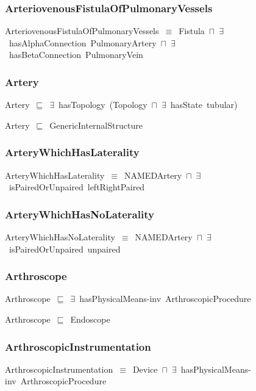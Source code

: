 \documentclass{article}
\begin{document}
\subsubsection*{ArteriovenousFistulaOfPulmonaryVessels}

ArteriovenousFistulaOfPulmonaryVessels~\ensuremath{\equiv}~Fistula~\ensuremath{\sqcap}~\ensuremath{\exists}~hasAlphaConnection~PulmonaryArtery~\ensuremath{\sqcap}~\ensuremath{\exists}~hasBetaConnection~PulmonaryVein

\subsubsection*{Artery}

Artery~\ensuremath{\sqsubseteq}~\ensuremath{\exists}~hasTopology~(Topology~\ensuremath{\sqcap}~\ensuremath{\exists}~hasState~tubular)~

Artery~\ensuremath{\sqsubseteq}~GenericInternalStructure~

\subsubsection*{ArteryWhichHasLaterality}

ArteryWhichHasLaterality~\ensuremath{\equiv}~NAMEDArtery~\ensuremath{\sqcap}~\ensuremath{\exists}~isPairedOrUnpaired~leftRightPaired

\subsubsection*{ArteryWhichHasNoLaterality}

ArteryWhichHasNoLaterality~\ensuremath{\equiv}~NAMEDArtery~\ensuremath{\sqcap}~\ensuremath{\exists}~isPairedOrUnpaired~unpaired

\subsubsection*{Arthroscope}

Arthroscope~\ensuremath{\sqsubseteq}~\ensuremath{\exists}~hasPhysicalMeans-inv~ArthroscopicProcedure~

Arthroscope~\ensuremath{\sqsubseteq}~Endoscope~

\subsubsection*{ArthroscopicInstrumentation}

ArthroscopicInstrumentation~\ensuremath{\equiv}~Device~\ensuremath{\sqcap}~\ensuremath{\exists}~hasPhysicalMeans-inv~ArthroscopicProcedure
\end{document}
